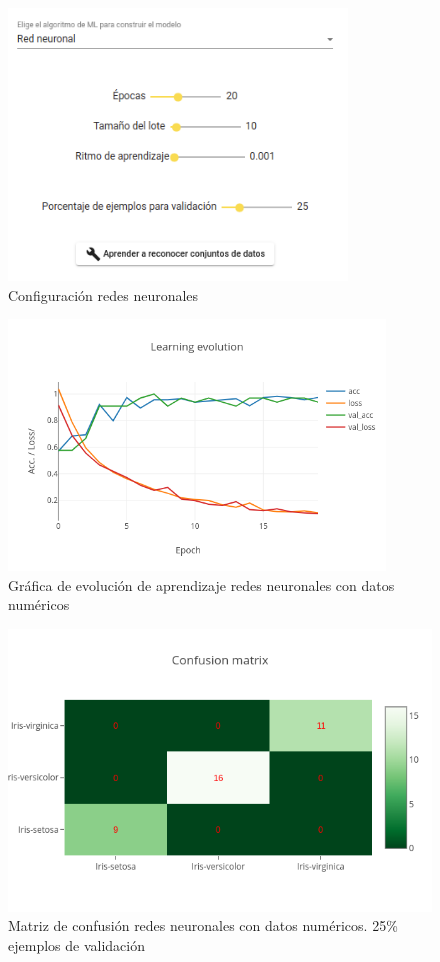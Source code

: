 \documentclass[a4paper, 12pt]{book}
\begin{document}
\begin{figure}
	\centering
	\includegraphics[width=9cm, keepaspectratio]{img/ej_num_rn.png}
	\caption{Configuración redes neuronales} 	\label{fig:ejemplo4}
\end{figure}

\begin{figure}
	\centering
	\includegraphics[width=10cm, keepaspectratio]{img/le_num_rn.png}
	\caption{Gráfica de evolución de aprendizaje redes neuronales con datos numéricos} 	\label{fig:ejemplo5}
\end{figure}

\begin{figure}
	\centering
	\includegraphics[width=12cm, keepaspectratio]{img/cm_num_rn.png}
	\caption{Matriz de confusión redes neuronales con datos numéricos. 25\% ejemplos de validación} 	
	\label{fig:ejemplo6}
\end{figure}
\end{document}
